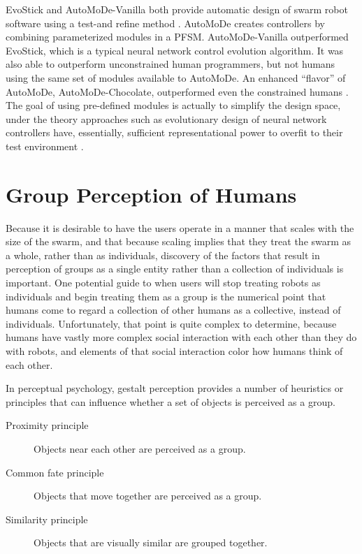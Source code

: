 EvoStick and AutoMoDe-Vanilla both provide automatic design of swarm robot software using a test-and refine method \citep{francesca2014experiment}. 
AutoMoDe creates controllers by combining parameterized modules in a PFSM. 
AutoMoDe-Vanilla outperformed EvoStick, which is a typical neural network control evolution algorithm.
It was also able to outperform unconstrained human programmers, but not humans using the same set of modules available to AutoMoDe. 
An enhanced ``flavor'' of AutoMoDe, AutoMoDe-Chocolate, outperformed even the constrained humans \citep{francesca2015automode}. 
The goal of using pre-defined modules is actually to simplify the design space, under the theory approaches such as evolutionary design of neural network controllers have, essentially, sufficient representational power to overfit to their test environment \citep{birattari2016observing}.

\section{Group Perception of Humans} \label{section:Group_Perception_of_Humans}

Because it is desirable to have the users operate in a manner that scales with the size of the swarm, and that because scaling implies that they treat the swarm as a whole, rather than as individuals, discovery of the factors that result in perception of groups as a single entity rather than a collection of individuals is important.
One potential guide to when users will stop treating robots as individuals and begin treating them as a group is the numerical point that humans come to regard a collection of other humans as a collective, instead of individuals. 
Unfortunately, that point is quite complex to determine, because humans have vastly more complex social interaction with each other than they do with robots, and elements of that social interaction color how humans think of each other. 

In perceptual psychology, gestalt perception provides a number of heuristics or principles that can influence whether a set of objects is perceived as a group. 
\begin{description}
\item[Proximity principle]
Objects near each other are perceived as a group.

\item[Common fate principle] 
Objects that move together are perceived as a group.

\item[Similarity principle]
Objects that are visually similar are grouped together.
\end{description}	

